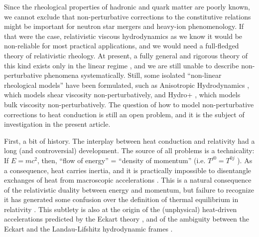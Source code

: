 \documentclass[a4paper, amsfonts, amssymb, amsmath, reprint, showkeys, nofootinbib, twoside, onecolumn, notitlepage]{revtex4-1}
\begin{document}
Since the rheological properties of hadronic and quark matter are poorly known, we cannot exclude that non-perturbative corrections to the constitutive relations might be important for neutron star mergers and heavy-ion phenomenology. If that were the case, relativistic viscous hydrodynamics as we know it would be non-reliable for most practical applications, and we would need a full-fledged theory of relativistic rheology. 
At present, a fully general and rigorous theory of this kind exists only in the linear regime \cite{GavassinoUniversality2023}, and we are still unable to describe non-perturbative phenomena systematically. Still, some isolated ``non-linear rheological models'' have been formulated, such as Anisotropic Hydrodynamics \cite{Strickland:2014pga,Alqahtani:2017mhy}, which models shear viscosity non-perturbatively, and Hydro+ \cite{Stephanov:2017ghc,GavassinoFarbulk2023}, which models bulk viscosity non-perturbatively. The question of how to model non-perturbative corrections to heat conduction is still an open problem, and it is the subject of investigation in the present article.

First, a bit of history. The interplay between heat conduction and relativity had a long (and controversial) development. The source of all problems is a technicality: If $E{=}mc^2$, then, ``flow of energy'' = ``density of momentum'' (i.e. $T^{j0}=T^{0j}$ \cite{MTW_book}). As a consequence, heat carries inertia, and it is practically impossible to disentangle exchanges of heat from macroscopic accelerations \cite{VanKampen1968}. This is a natural consequence of the relativistic duality between energy and momentum, but failure to recognize it has generated some confusion over the definition of thermal equilibrium in relativity \cite{GavassinoTermometri}. This subtlety is also at the origin of the (unphysical) heat-driven accelerations predicted by the Eckart theory \cite{GavassinoLyapunov_2020}, and of the ambiguity between the Eckart and the Landau-Lifshitz hydrodynamic frames \cite{Salazar2020}. 
\end{document}
